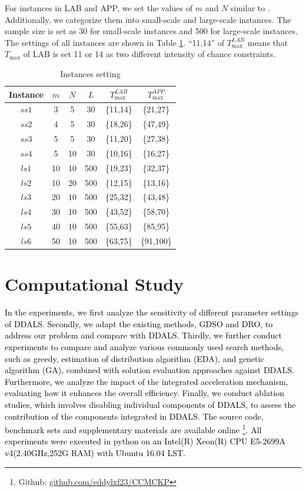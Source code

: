 \documentclass[lettersize,journal]{IEEEtran}
\begin{document}
For instances in LAB and APP, we set the values of $m$ and $N$ similar to \cite{mkaouar2020solving}. 
Additionally, we categorize them into small-scale and large-scale instances. 
The sample size is set as 30 for small-scale instances and 500 for large-scale instances.
The settings of all instances are shown in Table \ref{benchmark setting}.
``{11,14}'' of $T_{\max}^{LAB}$ means that $T_{\max}$ of LAB is set 11 or 14 as two different intensity of chance constraints.

\begin{table}[htpb]
\centering
\caption{Instances setting}
\begin{tabular}{cccccc}
\toprule
\bfseries Instance & $m$ & $N$ & $L$ & $T_{\max}^{LAB}$ & $T_{\max}^{APP}$\\
\midrule
{\bfseries $ss1$} &3 &5 &30 &\{11,14\} &\{21,27\}\\
{\bfseries $ss2$} &4 &5 &30 &\{18,26\} &\{47,49\}\\
{\bfseries $ss3$} &5 &5 &30 &\{11,20\} &\{27,38\}\\
{\bfseries $ss4$} &5 &10 &30 &\{10,16\} &\{16,27\}\\
{\bfseries $ls1$} &10 &10 &500 &\{19,23\} &\{32,37\}\\
{\bfseries $ls2$} &10 &20 &500 &\{12,15\} &\{13,16\}\\
{\bfseries $ls3$} &20 &10 &500 &\{25,32\} &\{43,48\}\\
{\bfseries $ls4$} &30 &10 &500 &\{43,52\} &\{58,70\}\\
{\bfseries $ls5$} &40 &10 &500 &\{55,63\} &\{85,95\}\\
{\bfseries $ls6$} &50 &10 &500 &\{63,75\} &\{91,100\}\\
\bottomrule
\end{tabular}
\label{benchmark setting}
\end{table}

\section{Computational Study}
\label{section:cs}
\textcolor{black}{
In the experiments, we first analyze the sensitivity of different parameter settings of DDALS.
Secondly, we adapt the existing methods, GDSO and DRO, to address our problem and compare with DDALS.
Thirdly, we further conduct experiments to compare and analyze various commonly used search methods, such as greedy, estimation of distribution algorithm (EDA), and genetic algorithm (GA), combined with solution evaluation approaches against DDALS.
Furthermore, we analyze the impact of the integrated acceleration mechanism, evaluating how it enhances the overall efficiency.
Finally, we conduct ablation studies, which involves disabling individual components of DDALS, to assess the contribution of the components integrated in DDALS.
The source code, benchmark sets and supplementary materials are available online \footnote{Github: \href{https://github.com/eddylxf23/CCMCKP}{github.com/eddylxf23/CCMCKP}}.
All experiments were executed in python on an Intel(R) Xeon(R) CPU E5-2699A v4(2.40GHz,252G RAM) with Ubuntu 16.04 LST. 
}
\end{document}
